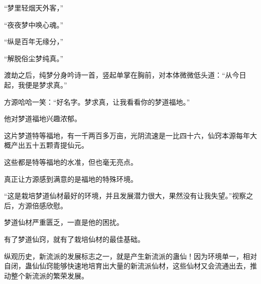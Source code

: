 \begin{this_body}
“梦里轻烟天外客，”

“夜夜梦中唤心魂。”

“纵是百年无缘分，”

“解脱俗尘梦纯真。”

渡劫之后，纯梦分身吟诗一首，竖起单掌在胸前，对本体微微低头道：“从今日起，我便是梦求真。”

方源哈哈一笑：“好名字。梦求真，让我看看你的梦道福地。”

他对梦道福地兴趣浓郁。

这片梦道特等福地，有一千两百多万亩，光阴流速是一比四十六，仙窍本源每年大概产出五十五颗青提仙元。

这些都是特等福地的水准，但也毫无亮点。

真正让方源感到满意的是福地的特殊环境。

“这是栽培梦道仙材最好的环境，并且发展潜力很大，果然没有让我失望。”视察之后，方源倍感欣慰。

梦道仙材严重匮乏，一直是他的困扰。

有了梦道仙窍，就有了栽培仙材的最佳基础。

纵观历史，新流派的发展标志之一，就是产生新流派的蛊仙！因为环境单一，相对自闭，蛊仙仙窍能够快速地培育出大量的新流派仙材，这些仙材又会流通出去，推动整个新流派的繁荣发展。

\end{this_body}

